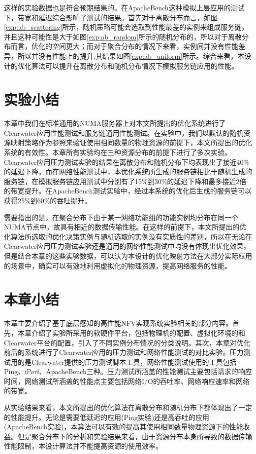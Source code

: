 这样的实验数据也是符合预期结果的。在ApacheBench这种模拟上层应用的测试下，带宽和延迟综合影响了测试的结果。首先对于离散分布而言，如图\ref{exp:ab_scattering}所示，随机策略可能会选取到性能最差的实例来组成服务链，并且这种可能性是大于如图\ref{exp:ab_random}所示的随机分布的，所以对于离散分布而言，优化的空间更大；而对于聚合分布的情况下来看，实例间并没有性能差异，所以并没有性能上的提升,其结果如图\ref{exp:ab_uniform}所示。综合来看，本设计的优化算法可以提升在离散分布和随机分布情况下模拟服务链应用的性能。

\newpage
\section{实验小结}
本章中我们在标准通用的NUMA服务器上对本文所提出的优化系统进行了Clearwater应用性能测试和服务链通用性能测试。在实验中，我们以默认的随机资源映射策略作为参照来验证使用相同数量的物理资源的前提下，本文所提出的优化系统的有效性。本章所有实验均在三种资源分布的前提下进行了多次实验。Clearwater应用压力测试实验的结果在离散分布和随机分布下均表现出了接近40\%的延迟下降。而在网络性能测试中，本优化系统所生成的服务链相比于随机生成的服务链，在模拟服务链应用测试中分别有了15\%到30\%的延迟下降和最多接近2倍的带宽提升。在ApacheBench测试实验中，经过本系统的优化后生成的服务链可以获得25\%到60\%的吞吐提升。

需要指出的是，在聚合分布下由于某一网络功能组的功能实例均分布在同一个NUMA节点中，故具有相近的数据传输性能。在这样的前提下，本文所提出的优化算法所选取的优化决策实例与随机选取的实例没有实质性的差别，所以在无论在Clearwater应用压力测试实验还是通用的网络性能测试中均没有体现出优化效果。但是结合本章的这些实验数据，可以认为本设计的优化映射方法在大部分实际应用的场景中，确实可以有效地利用虚拟化的物理资源，提高网络服务的性能。

\section{本章小结}
本章主要介绍了基于底层感知的高性能NFV实现系统实验相关的部分内容。首先，本章介绍了实验所采用的软硬件平台，包括物理机的配置、虚拟化环境的和Clearwater平台的配置，引入了不同实例分布情况的分类说明。其次，本章对优化前后的系统进行了Clearwater应用的压力测试和网络性能测试的对比实验。压力测试用的是Clearwater提供的压力测试脚本工具，网络性能测试使用的工具包括Ping、iPerf、ApacheBench三种。压力测试所涵盖的性能测试主要包括请求的响应时间，网络测试所涵盖的性能点主要包括网络I/O的吞吐率、网络响应速率和网络的带宽。

从实验结果来看，本文所提出的优化算法在离散分布和随机分布下都体现出了一定的性能提升。无论是需要低延迟的应用(Ping实验)还是高吞吐的应用(ApacheBench实验)，本算法可以有效的提高其使用相同数量物理资源下的性能收益。但是聚合分布下的分析和实验结果来看，由于资源分布本身所导致的数据传输性能限制，本设计算法并不能提高资源的使用效率。